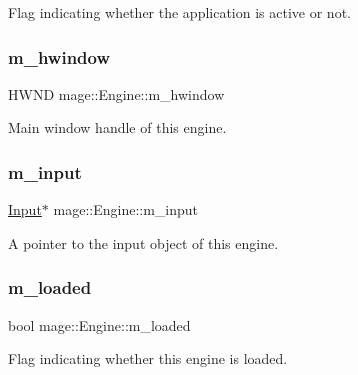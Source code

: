 Flag indicating whether the application is active or not. \hypertarget{classmage_1_1_engine_a1dda09f0ed656180f926616a0d3f95f1}{}\label{classmage_1_1_engine_a1dda09f0ed656180f926616a0d3f95f1} 
\subsubsection{\texorpdfstring{m\+\_\+hwindow}{m\_hwindow}}
{\footnotesize\ttfamily H\+W\+ND mage\+::\+Engine\+::m\+\_\+hwindow\hspace{0.3cm}{\ttfamily [private]}}

Main window handle of this engine. \hypertarget{classmage_1_1_engine_a432ac639c593fd0fb8cede2463fe10c2}{}\label{classmage_1_1_engine_a432ac639c593fd0fb8cede2463fe10c2} 
\subsubsection{\texorpdfstring{m\+\_\+input}{m\_input}}
{\footnotesize\ttfamily \hyperlink{classmage_1_1_input}{Input}$\ast$ mage\+::\+Engine\+::m\+\_\+input\hspace{0.3cm}{\ttfamily [private]}}

A pointer to the input object of this engine. \hypertarget{classmage_1_1_engine_a2f8783761b9629dd507d0a6bc456125b}{}\label{classmage_1_1_engine_a2f8783761b9629dd507d0a6bc456125b} 
\subsubsection{\texorpdfstring{m\+\_\+loaded}{m\_loaded}}
{\footnotesize\ttfamily bool mage\+::\+Engine\+::m\+\_\+loaded\hspace{0.3cm}{\ttfamily [private]}}

Flag indicating whether this engine is loaded. \hypertarget{classmage_1_1_engine_a18fdbe3d9cf290ed13be3a169fabbaa3}{}\label{classmage_1_1_engine_a18fdbe3d9cf290ed13be3a169fabbaa3} 
